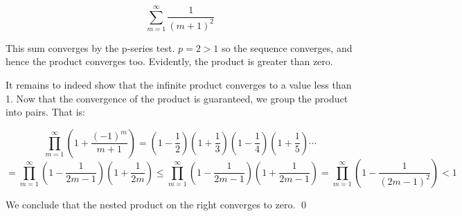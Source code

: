 \documentclass{article}
\begin{document}
\[
    \sum_{m = 1}^\infty \frac{1}{(m+1)^2}
\]

This sum converges by the p-series test. $p = 2 > 1$ so the 
sequence converges, and hence the product converges too. 
Evidently, the product is greater than zero. 

It remains to indeed show that the infinite product converges to 
a value less than 1. Now that the convergence of the product is 
guaranteed, we group the product into pairs. That is:


\newcommand{\term}[1]{{
    \left(
        1 + \frac{1}{#1}
    \right)
}
}

\newcommand{\nterm}[1]{{
    \left(
        1 - \frac{1}{#1}
    \right)
}
}
\[
    \prod^\infty_{m = 1}\left(1 + \frac{(-1)^m}{m + 1}\right)
    =
    \nterm{2} \term{3} \nterm{4} \term{5} \cdots
\]
\[
    = 
    \prod^\infty_{m = 1}\nterm{2m - 1}\term{2m}
    \leq 
    \prod^\infty_{m = 1}\nterm{2m - 1}\term{2m - 1}
    = 
    \prod^\infty_{m = 1}\nterm{(2m-1)^2} < 1
\]

We conclude that the nested product on the right converges to zero. 
\qed
\end{document}
